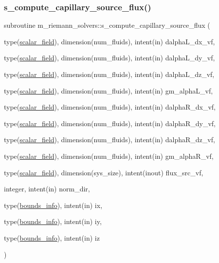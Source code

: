 \subsubsection{\texorpdfstring{s\+\_\+compute\+\_\+capillary\+\_\+source\+\_\+flux()}{s\_compute\_capillary\_source\_flux()}}
{\footnotesize\ttfamily subroutine m\+\_\+riemann\+\_\+solvers\+::s\+\_\+compute\+\_\+capillary\+\_\+source\+\_\+flux (\begin{DoxyParamCaption}\item[{type(\hyperlink{structm__derived__types_1_1scalar__field}{scalar\+\_\+field}), dimension(num\+\_\+fluids), intent(in)}]{dalpha\+L\+\_\+dx\+\_\+vf,  }\item[{type(\hyperlink{structm__derived__types_1_1scalar__field}{scalar\+\_\+field}), dimension(num\+\_\+fluids), intent(in)}]{dalpha\+L\+\_\+dy\+\_\+vf,  }\item[{type(\hyperlink{structm__derived__types_1_1scalar__field}{scalar\+\_\+field}), dimension(num\+\_\+fluids), intent(in)}]{dalpha\+L\+\_\+dz\+\_\+vf,  }\item[{type(\hyperlink{structm__derived__types_1_1scalar__field}{scalar\+\_\+field}), dimension(num\+\_\+fluids), intent(in)}]{gm\+\_\+alpha\+L\+\_\+vf,  }\item[{type(\hyperlink{structm__derived__types_1_1scalar__field}{scalar\+\_\+field}), dimension(num\+\_\+fluids), intent(in)}]{dalpha\+R\+\_\+dx\+\_\+vf,  }\item[{type(\hyperlink{structm__derived__types_1_1scalar__field}{scalar\+\_\+field}), dimension(num\+\_\+fluids), intent(in)}]{dalpha\+R\+\_\+dy\+\_\+vf,  }\item[{type(\hyperlink{structm__derived__types_1_1scalar__field}{scalar\+\_\+field}), dimension(num\+\_\+fluids), intent(in)}]{dalpha\+R\+\_\+dz\+\_\+vf,  }\item[{type(\hyperlink{structm__derived__types_1_1scalar__field}{scalar\+\_\+field}), dimension(num\+\_\+fluids), intent(in)}]{gm\+\_\+alpha\+R\+\_\+vf,  }\item[{type(\hyperlink{structm__derived__types_1_1scalar__field}{scalar\+\_\+field}), dimension(sys\+\_\+size), intent(inout)}]{flux\+\_\+src\+\_\+vf,  }\item[{integer, intent(in)}]{norm\+\_\+dir,  }\item[{type(\hyperlink{structm__derived__types_1_1bounds__info}{bounds\+\_\+info}), intent(in)}]{ix,  }\item[{type(\hyperlink{structm__derived__types_1_1bounds__info}{bounds\+\_\+info}), intent(in)}]{iy,  }\item[{type(\hyperlink{structm__derived__types_1_1bounds__info}{bounds\+\_\+info}), intent(in)}]{iz }\end{DoxyParamCaption})}



